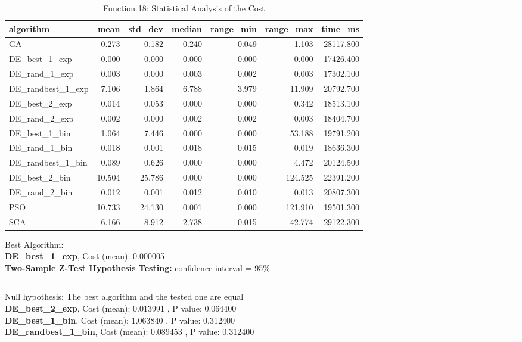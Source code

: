 \documentclass[12pt]{article}
\begin{document}
\begin{table}[H]
    \centering
    \footnotesize
\begin{tabular}{lrrrrrr}
\toprule
         algorithm &   mean &  std\_dev &  median &  range\_min &  range\_max &   time\_ms \\
\midrule
                GA &  0.273 &    0.182 &   0.240 &      0.049 &      1.103 & 28117.800 \\
     DE\_best\_1\_exp &  0.000 &    0.000 &   0.000 &      0.000 &      0.000 & 17426.400 \\
     DE\_rand\_1\_exp &  0.003 &    0.000 &   0.003 &      0.002 &      0.003 & 17302.100 \\
 DE\_randbest\_1\_exp &  7.106 &    1.864 &   6.788 &      3.979 &     11.909 & 20792.700 \\
     DE\_best\_2\_exp &  0.014 &    0.053 &   0.000 &      0.000 &      0.342 & 18513.100 \\
     DE\_rand\_2\_exp &  0.002 &    0.000 &   0.002 &      0.002 &      0.003 & 18404.700 \\
     DE\_best\_1\_bin &  1.064 &    7.446 &   0.000 &      0.000 &     53.188 & 19791.200 \\
     DE\_rand\_1\_bin &  0.018 &    0.001 &   0.018 &      0.015 &      0.019 & 18636.300 \\
 DE\_randbest\_1\_bin &  0.089 &    0.626 &   0.000 &      0.000 &      4.472 & 20124.500 \\
     DE\_best\_2\_bin & 10.504 &   25.786 &   0.000 &      0.000 &    124.525 & 22391.200 \\
     DE\_rand\_2\_bin &  0.012 &    0.001 &   0.012 &      0.010 &      0.013 & 20807.300 \\
               PSO & 10.733 &   24.130 &   0.001 &      0.000 &    121.910 & 19501.300 \\
               SCA &  6.166 &    8.912 &   2.738 &      0.015 &     42.774 & 29122.300 \\
\bottomrule
\end{tabular}

\caption{Function 18: Statistical Analysis of the Cost} 
    \end{table}
Best Algorithm: \\
\textbf{DE\_best\_1\_exp}, Cost (mean): 0.000005\\
\noindent
\textbf{Two-Sample Z-Test Hypothesis Testing: }
confidence interval = 95\%\\
\vspace{-3mm}
\rule[3mm]{\linewidth}{0.2pt}
Null hypothesis: The best algorithm and the tested one are equal\\
\textbf{DE\_best\_2\_exp}, Cost (mean): 0.013991
, P value: 0.064400\\
\textbf{DE\_best\_1\_bin}, Cost (mean): 1.063840
, P value: 0.312400\\
\textbf{DE\_randbest\_1\_bin}, Cost (mean): 0.089453
, P value: 0.312400\\
\end{document}
